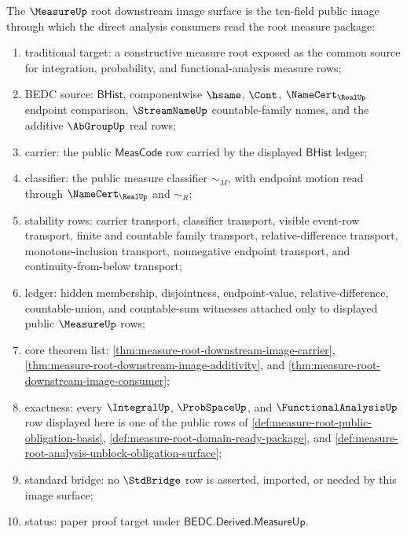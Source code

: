 \begin{definition}
\label{def:measure-root-downstream-image-surface}
The $\MeasureUp$ root downstream image surface is the ten-field public image
through which the direct analysis consumers read the root measure package:
\begin{enumerate}
  \item traditional target: a constructive measure root exposed as the common
  source for integration, probability, and functional-analysis measure rows;
  \item BEDC source: $\mathsf{BHist}$, componentwise $\hsame$, $\Cont$,
  $\NameCert_{\RealUp}$ endpoint comparison, $\StreamNameUp$ countable-family
  names, and the additive $\AbGroupUp$ real rows;
  \item carrier: the public $\mathsf{MeasCode}$ row carried by the displayed
  $\mathsf{BHist}$ ledger;
  \item classifier: the public measure classifier $\sim_M$, with endpoint
  motion read through $\NameCert_{\RealUp}$ and $\sim_R$;
  \item stability rows: carrier transport, classifier transport, visible
  event-row transport, finite and countable family transport,
  relative-difference transport, monotone-inclusion transport, nonnegative
  endpoint transport, and continuity-from-below transport;
  \item ledger: hidden membership, disjointness, endpoint-value,
  relative-difference, countable-union, and countable-sum witnesses attached
  only to displayed public $\MeasureUp$ rows;
  \item core theorem list:
  \autoref{thm:measure-root-downstream-image-carrier},
  \autoref{thm:measure-root-downstream-image-additivity}, and
  \autoref{thm:measure-root-downstream-image-consumer};
  \item exactness: every $\IntegralUp$, $\ProbSpaceUp$, and
  $\FunctionalAnalysisUp$ row displayed here is one of the public rows of
  \autoref{def:measure-root-public-obligation-basis},
  \autoref{def:measure-root-domain-ready-package}, and
  \autoref{def:measure-root-analysis-unblock-obligation-surface};
  \item standard bridge: no $\StdBridge$ row is asserted, imported, or needed
  by this image surface;
  \item status: paper proof target under
  $\mathsf{BEDC.Derived.MeasureUp}$.
\end{enumerate}
\end{definition}

